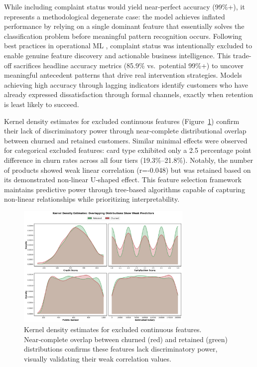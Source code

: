 \documentclass[12pt]{article}
\begin{document}
While including complaint status would yield near‑perfect accuracy (99\%+), it represents a methodological degenerate case: the model achieves inflated performance by relying on a single dominant feature that essentially solves the classification problem before meaningful pattern recognition occurs.  Following best practices in operational ML \citep{kumar2022customerretention}, complaint status was intentionally excluded to enable genuine feature discovery and actionable business intelligence.  This trade-off sacrifices headline accuracy metrics (85.9\% vs.\ potential 99\%+) to uncover meaningful antecedent patterns that drive real intervention strategies.  Models achieving high accuracy through lagging indicators identify customers who have already expressed dissatisfaction through formal channels, exactly when retention is least likely to succeed.

Kernel density estimates for excluded continuous features (Figure~\ref{fig:kde_weak}) confirm their lack of discriminatory power through near‑complete distributional overlap between churned and retained customers.  Similar minimal effects were observed for categorical excluded features: card type exhibited only a 2.5 percentage point difference in churn rates across all four tiers (19.3\%–21.8\%).  Notably, the number of products showed weak linear correlation (r=-0.048) but was retained based on its demonstrated non‑linear U‑shaped effect.  This feature selection framework maintains predictive power through tree‑based algorithms capable of capturing non‑linear relationships while prioritizing interpretability.

\begin{figure}[H]
\centering
\includegraphics[width=0.75\textwidth]{img/poc_kde_plots.png}
\caption{Kernel density estimates for excluded continuous features. Near‑complete overlap between churned (red) and retained (green) distributions confirms these features lack discriminatory power, visually validating their weak correlation values.}
\label{fig:kde_weak}
\end{figure}
\end{document}
